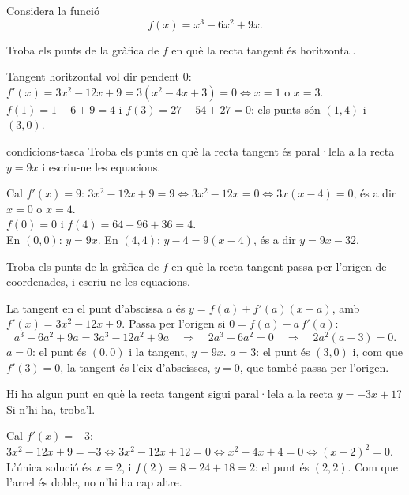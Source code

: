 Considera la funció
\[
f(x)=x^3-6x^2+9x .
\]

\begin{apartats}

Troba els punts de la gràfica de $f$ en què la recta tangent és horitzontal.

\begin{solucio}
Tangent horitzontal vol dir pendent $0$:
$f'(x)=3x^2-12x+9=3\left(x^2-4x+3\right)=0\iff x=1$ o $x=3$.\\
$f(1)=1-6+9=4$ i $f(3)=27-54+27=0$: els punts són $\boxed{(1,4)}$ i $\boxed{(3,0)}$.
\end{solucio}

\begin{tria}{condicions-tasca}
Troba els punts en què la recta tangent és paral·lela a la recta $y=9x$ i escriu-ne les
equacions.

\begin{solucio}
Cal $f'(x)=9$: $3x^2-12x+9=9\iff3x^2-12x=0\iff 3x(x-4)=0$, és a dir $x=0$ o $x=4$.\\
$f(0)=0$ i $f(4)=64-96+36=4$.\\
En $(0,0)$: $y=9x$. \quad En $(4,4)$: $y-4=9(x-4)$, és a dir $y=9x-32$.
\end{solucio}

Troba els punts de la gràfica de $f$ en què la recta tangent passa per l'origen de coordenades, i
escriu-ne les equacions.

\begin{solucio}
La tangent en el punt d'abscissa $a$ és $y=f(a)+f'(a)(x-a)$, amb $f'(x)=3x^2-12x+9$. Passa per
l'origen si $0=f(a)-a\,f'(a)$:
\[
a^3-6a^2+9a=3a^3-12a^2+9a\quad\Longrightarrow\quad 2a^3-6a^2=0\quad\Longrightarrow\quad 2a^2(a-3)=0 .
\]
$a=0$: el punt és $(0,0)$ i la tangent, $y=9x$. $a=3$: el punt és $(3,0)$ i, com que $f'(3)=0$, la
tangent és l'eix d'abscisses, $y=0$, que també passa per l'origen.
\end{solucio}
\end{tria}

\begin{nomesllarg}
Hi ha algun punt en què la recta tangent sigui paral·lela a la recta $y=-3x+1$? Si n'hi ha,
troba'l.

\begin{solucio}
Cal $f'(x)=-3$: $3x^2-12x+9=-3\iff3x^2-12x+12=0\iff x^2-4x+4=0\iff(x-2)^2=0$.\\
L'única solució és $x=2$, i $f(2)=8-24+18=2$: el punt és $(2,2)$. Com que l'arrel és doble,
no n'hi ha cap altre.
\end{solucio}
\end{nomesllarg}

\end{apartats}
